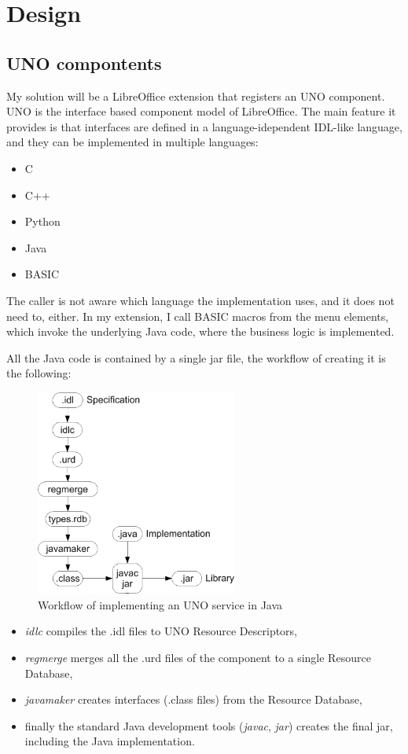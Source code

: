 \section{Design}

\subsection{UNO compontents}

My solution will be a LibreOffice extension that registers an UNO\cite{uno}
component. UNO is the interface based component model of LibreOffice. The main
feature it provides is that interfaces are defined in a language-idependent
IDL-like language, and they can be implemented in multiple languages:

\begin{itemize}
\item C
\item C++
\item Python
\item Java
\item BASIC
\end{itemize}

The caller is not aware which language the implementation uses, and it does not
need to, either. In my extension, I call BASIC macros from the menu elements,
which invoke the underlying Java code, where the business logic is implemented.

All the Java code is contained by a single jar file, the workflow of creating
it is the following:

\begin{figure}[H]
\centering
\includegraphics[width=250px,keepaspectratio]{uno-java.pdf}
\caption{Workflow of implementing an UNO service in Java}
\end{figure}

\begin{itemize}
\item \emph{idlc} compiles the .idl files to UNO Resource Descriptors,
\item \emph{regmerge} merges all the .urd files of the component to a single Resource Database,
\item \emph{javamaker} creates interfaces (.class files) from the Resource Database,
\item finally the standard Java development tools (\emph{javac}, \emph{jar})
creates the final jar, including the Java implementation.
\end{itemize}

